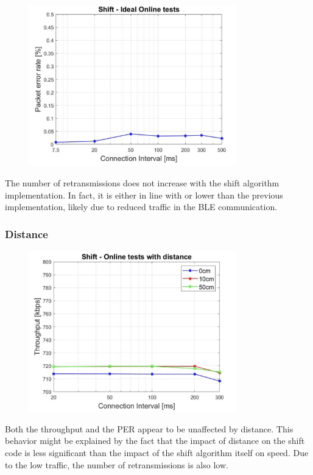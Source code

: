 \documentclass{Configuration_Files/PoliMi3i_thesis}
\begin{document}
\begin{figure}[h!]
    \centering
    \includegraphics[width=0.8\textwidth]{Results Manuel/figure16}
    \label{fig:figure1}
\end{figure}

The number of retransmissions does not increase with the shift algorithm implementation. In fact, it is either in line with or lower than the previous implementation, likely due to reduced traffic in the BLE communication.

\subsubsection*{Distance}

\begin{figure}[h!]
    \centering
    \includegraphics[width=0.8\textwidth]{Results Manuel/figure17}
    \label{fig:figure1}
\end{figure}

Both the throughput and the PER appear to be unaffected by distance. This behavior might be explained by the fact that the impact of distance on the shift code is less significant than the impact of the shift algorithm itself on speed. Due to the low traffic, the number of retransmissions is also low.
\end{document}
